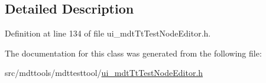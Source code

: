 \subsection{Detailed Description}


Definition at line 134 of file ui\-\_\-mdt\-Tt\-Test\-Node\-Editor.\-h.



The documentation for this class was generated from the following file\-:\begin{DoxyCompactItemize}
\item 
src/mdttools/mdttesttool/\hyperlink{ui__mdt_tt_test_node_editor_8h}{ui\-\_\-mdt\-Tt\-Test\-Node\-Editor.\-h}\end{DoxyCompactItemize}
